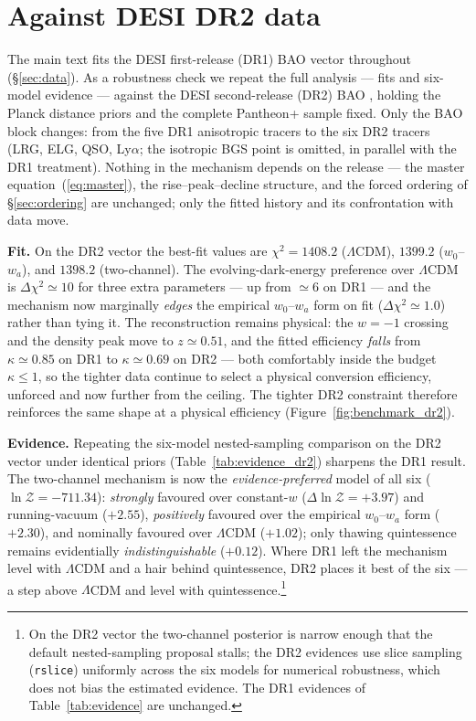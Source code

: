 \documentclass[11pt,a4paper]{article}
\newcommand{\lcdm}{\ensuremath{\Lambda}CDM}
\begin{document}
\FloatBarrier
\section{Against DESI DR2 data}\label{app:dr2}

The main text fits the DESI first-release (DR1) BAO vector throughout (\S\ref{sec:data}). As a robustness check we repeat the full analysis --- fits and six-model evidence --- against the DESI second-release (DR2) BAO \citep{DESI_DR2}, holding the Planck distance priors and the complete Pantheon+ sample fixed. Only the BAO block changes: from the five DR1 anisotropic tracers to the six DR2 tracers (LRG, ELG, QSO, Ly$\alpha$; the isotropic BGS point is omitted, in parallel with the DR1 treatment). Nothing in the mechanism depends on the release --- the master equation~(\ref{eq:master}), the rise--peak--decline structure, and the forced ordering of \S\ref{sec:ordering} are unchanged; only the fitted history and its confrontation with data move.

\textbf{Fit.} On the DR2 vector the best-fit values are $\chi^2=1408.2$ (\lcdm{}), $1399.2$ ($w_0$--$w_a$), and $1398.2$ (two-channel). The evolving-dark-energy preference over \lcdm{} is $\Delta\chi^2\simeq10$ for three extra parameters --- up from $\simeq6$ on DR1 --- and the mechanism now marginally \emph{edges} the empirical $w_0$--$w_a$ form on fit ($\Delta\chi^2\simeq1.0$) rather than tying it. The reconstruction remains physical: the $w=-1$ crossing and the density peak move to $z\simeq0.51$, and the fitted efficiency \emph{falls} from $\kappa\simeq0.85$ on DR1 to $\kappa\simeq0.69$ on DR2 --- both comfortably inside the budget $\kappa\le1$, so the tighter data continue to select a physical conversion efficiency, unforced and now further from the ceiling. The tighter DR2 constraint therefore reinforces the same shape at a physical efficiency (Figure~\ref{fig:benchmark_dr2}).

\textbf{Evidence.} Repeating the six-model nested-sampling comparison on the DR2 vector under identical priors (Table~\ref{tab:evidence_dr2}) sharpens the DR1 result. The two-channel mechanism is now the \emph{evidence-preferred} model of all six ($\ln\mathcal{Z}=-711.34$): \emph{strongly} favoured over constant-$w$ ($\Delta\ln\mathcal{Z}=+3.97$) and running-vacuum ($+2.55$), \emph{positively} favoured over the empirical $w_0$--$w_a$ form ($+2.30$), and nominally favoured over \lcdm{} ($+1.02$); only thawing quintessence remains evidentially \emph{indistinguishable} ($+0.12$). Where DR1 left the mechanism level with \lcdm{} and a hair behind quintessence, DR2 places it best of the six --- a step above \lcdm{} and level with quintessence.\footnote{On the DR2 vector the two-channel posterior is narrow enough that the default nested-sampling proposal stalls; the DR2 evidences use slice sampling (\texttt{rslice}) uniformly across the six models for numerical robustness, which does not bias the estimated evidence. The DR1 evidences of Table~\ref{tab:evidence} are unchanged.}
\end{document}
